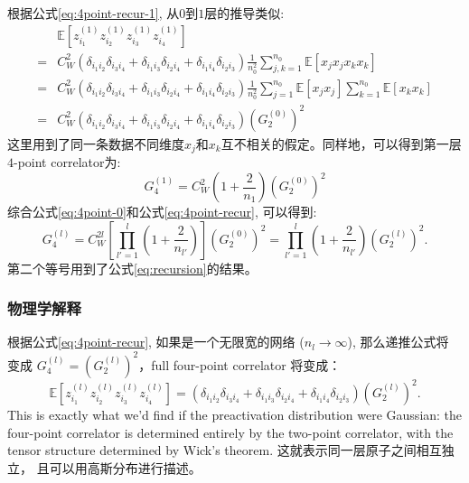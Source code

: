 根据公式\ref{eq:4point-recur-1}, 从$0$到$1$层的推导类似:
\begin{equation*}
    \begin{aligned}
     & \mathbb{E}[z_{i_1}^{(1)}z_{i_2}^{(1)}z_{i_3}^{(1)}z_{i_4}^{(1)}] \\
    =& C_W^2 (\delta_{i_1i_2}\delta_{i_3i_4} + \delta_{i_1i_3}\delta_{i_2i_4} 
            + \delta_{i_1i_4}\delta_{i_2i_3}) \frac{1}{n_0^2} 
            \sum_{j,k=1}^{n_0} \mathbb{E}[x_jx_jx_kx_k] \\
    =& C_W^2 (\delta_{i_1i_2}\delta_{i_3i_4} + \delta_{i_1i_3}\delta_{i_2i_4} 
            + \delta_{i_1i_4}\delta_{i_2i_3}) \frac{1}{n_0^2} 
            \sum_{j=1}^{n_0} \mathbb{E}[x_jx_j] \sum_{k=1}^{n_0} \mathbb{E}[x_k x_k] \\
    =&  C_W^2 (\delta_{i_1i_2}\delta_{i_3i_4} + \delta_{i_1i_3}\delta_{i_2i_4} 
            + \delta_{i_1i_4}\delta_{i_2i_3}) (G_2^{(0)})^2
    \end{aligned}
\end{equation*}
这里用到了同一条数据不同维度$x_j$和$x_k$互不相关的假定。同样地，可以得到第一层$4$-point correlator为:
\begin{equation}
    G_4^{(1)} = C_W^2 (1+ \frac{2}{n_1}) (G_2^{(0)})^2
    \label{eq:4point-0}
\end{equation}
综合公式\ref{eq:4point-0}和公式\ref{eq:4point-recur}, 可以得到:
\begin{equation}
    G_4^{(l)} = C_W^{2l}[\prod_{l'=1}^l(1+\frac{2}{n_{l'}})](G_2^{(0)})^2
        = \prod_{l'=1}^l(1+\frac{2}{n_{l'}})(G_2^{(l)})^2.
    \label{eq:4point-recur}
\end{equation}
第二个等号用到了公式\ref{eq:recursion}的结果。

\subsubsection{物理学解释}
根据公式\ref{eq:4point-recur}, 如果是一个无限宽的网络 ($n_l \to \infty$), 那么递推公式将
变成 $G_4^{(l)} = (G_2^{(l)})^2$，full four-point correlator 将变成：
\begin{equation*}
    \mathbb{E}[z_{i_1}^{(l)}z_{i_2}^{(l)}z_{i_3}^{(l)}z_{i_4}^{(l)}]
        = (\delta_{i_1i_2}\delta_{i_3i_4} + \delta_{i_1i_3}\delta_{i_2i_4}
            + \delta_{i_1i_4}\delta_{i_2i_3}) (G_2^{(l)})^2.
\end{equation*}
This is exactly what we'd find if the preactivation distribution were Gaussian: 
the four-point correlator is determined entirely by the two-point correlator, 
with the tensor structure determined by Wick's theorem. 这就表示同一层原子之间相互独立，
且可以用高斯分布进行描述。

